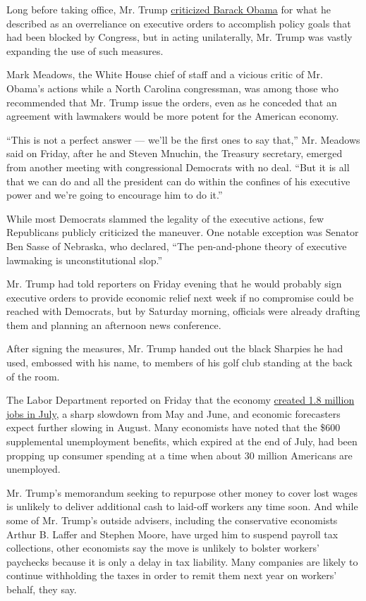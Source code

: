 Long before taking office, Mr. Trump
\href{https://twitter.com/realdonaldtrump/status/222739756105207808}{criticized
Barack Obama} for what he described as an overreliance on executive
orders to accomplish policy goals that had been blocked by Congress, but
in acting unilaterally, Mr. Trump was vastly expanding the use of such
measures.

Mark Meadows, the White House chief of staff and a vicious critic of Mr.
Obama's actions while a North Carolina congressman, was among those who
recommended that Mr. Trump issue the orders, even as he conceded that an
agreement with lawmakers would be more potent for the American economy.

``This is not a perfect answer --- we'll be the first ones to say
that,'' Mr. Meadows said on Friday, after he and Steven Mnuchin, the
Treasury secretary, emerged from another meeting with congressional
Democrats with no deal. ``But it is all that we can do and all the
president can do within the confines of his executive power and we're
going to encourage him to do it.''

While most Democrats slammed the legality of the executive actions, few
Republicans publicly criticized the maneuver. One notable exception was
Senator Ben Sasse of Nebraska, who declared, ``The pen-and-phone theory
of executive lawmaking is unconstitutional slop.''

Mr. Trump had told reporters on Friday evening that he would probably
sign executive orders to provide economic relief next week if no
compromise could be reached with Democrats, but by Saturday morning,
officials were already drafting them and planning an afternoon news
conference.

After signing the measures, Mr. Trump handed out the black Sharpies he
had used, embossed with his name, to members of his golf club standing
at the back of the room.

The Labor Department reported on Friday that the economy
\href{https://www.nytimes3xbfgragh.onion/2020/08/07/business/economy/july-jobs-report.html}{created
1.8 million jobs in July}, a sharp slowdown from May and June, and
economic forecasters expect further slowing in August. Many economists
have noted that the \$600 supplemental unemployment benefits, which
expired at the end of July, had been propping up consumer spending at a
time when about 30 million Americans are unemployed.

Mr. Trump's memorandum seeking to repurpose other money to cover lost
wages is unlikely to deliver additional cash to laid-off workers any
time soon. And while some of Mr. Trump's outside advisers, including the
conservative economists Arthur B. Laffer and Stephen Moore, have urged
him to suspend payroll tax collections, other economists say the move is
unlikely to bolster workers' paychecks because it is only a delay in tax
liability. Many companies are likely to continue withholding the taxes
in order to remit them next year on workers' behalf, they say.

